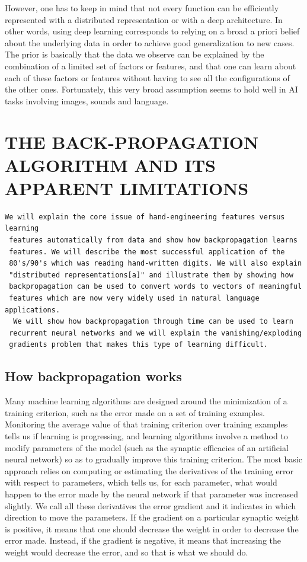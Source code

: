 \documentclass{article} %
\begin{document}
However, one has to keep in mind that not every function can be efficiently
represented with a distributed representation or with a deep
architecture. In other words, using deep learning corresponds to relying on
a broad a priori belief about the underlying data in order to achieve good
generalization to new cases. The prior is basically that the data we
observe can be explained by the combination of a limited set of factors or
features, and that one can learn about each of these factors or features
without having to see all the configurations of the other
ones. Fortunately, this very broad assumption seems to hold well in AI
tasks involving images, sounds and language.




\section{THE BACK-PROPAGATION ALGORITHM AND ITS APPARENT LIMITATIONS}


\begin{verbatim}
We will explain the core issue of hand-engineering features versus learning
 features automatically from data and show how backpropagation learns
 features. We will describe the most successful application of the
 80's/90's which was reading hand-written digits. We will also explain
 "distributed representations[a]" and illustrate them by showing how
 backpropagation can be used to convert words to vectors of meaningful
 features which are now very widely used in natural language applications.
  We will show how backpropagation through time can be used to learn
 recurrent neural networks and we will explain the vanishing/exploding
 gradients problem that makes this type of learning difficult.
\end{verbatim}

\subsection{How backpropagation works}

Many machine learning algorithms are designed around the minimization of a
training criterion, such as the error made on a set of training
examples. Monitoring the average value of that training criterion over
training examples tells us if learning is progressing, and learning
algorithms involve a method to modify parameters of the model (such as the
synaptic efficacies of an artificial neural network) so as to gradually
improve this training criterion. The most basic approach relies on
computing or estimating the derivatives of the training error with respect
to parameters, which tells us, for each parameter, what would happen to the
error made by the neural network if that parameter was increased
slightly. We call all these derivatives the error gradient and it indicates
in which direction to move the parameters. If the gradient on a particular
synaptic weight is positive, it means that one should decrease the weight
in order to decrease the error made. Instead, if the gradient is negative,
it means that increasing the weight would decrease the error, and so that
is what we should do.
\end{document}
